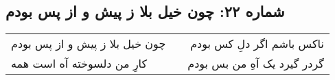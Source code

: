 \begin{center}
\section*{شماره ۲۲: چون خیل بلا ز پیش و از پس بودم}
\label{sec:022}
\begin{longtable}{l p{0.5cm} r}
چون خیل بلا ز پیش و از پس بودم
&&
ناکس باشم اگر دلِ کس بودم
\\
کارِ من دلسوخته آه است همه
&&
گردر گیرد یک آهِ من بس بودم
\\
\end{longtable}
\end{center}
